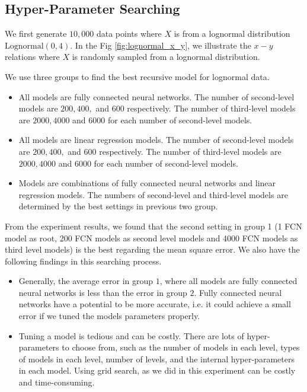 \subsection{Hyper-Parameter Searching}

We first generate $10,000$ data points where $X$ is from a lognormal distribution $\text{Lognormal}(0, 4)$. In the Fig \ref{fig:lognormal_x_y}, we illustrate the $x-y$ relations where $X$ is randomly sampled from a lognormal distribution.

We use three groups to find the best recursive model for lognormal data.
\begin{itemize}
	\item All models are fully connected neural networks. The number of second-level models are $200, 400,$ and $600$ respectively. The number of third-level models are $2000, 4000$ and $6000$ for each number of second-level models.
	\item All models are linear regression models. The number of second-level models are $200, 400,$ and $600$ respectively. The number of third-level models are $2000, 4000$ and $6000$ for each number of second-level models.
	\item Models are combinations of fully connected neural networks and linear regression models. The numbers of second-level and third-level models are determined by the best settings in previous two group.
\end{itemize}

\begin{figure}
	
\end{figure}

From the experiment results, we found that the second setting in group 1 (1 FCN model as root, 200 FCN models as second level models and 4000 FCN models as third level models) is the best regarding the mean square error. We also have the following findings in this searching process.

\begin{itemize}
	\item Generally, the average error in group $1$, where all models are fully connected neural networks is less than the error in group $2$. Fully connected neural networks have a potential to be more accurate, i.e. it could achieve a small error if we tuned the models parameters properly.
	\item Tuning a model is tedious and can be costly. There are lots of hyper-parameters to choose from, such as the number of models in each level, types of models in each level, number of levels, and the internal hyper-parameters in each model. Using grid search, as we did in this experiment can be costly and time-consuming.
\end{itemize}

